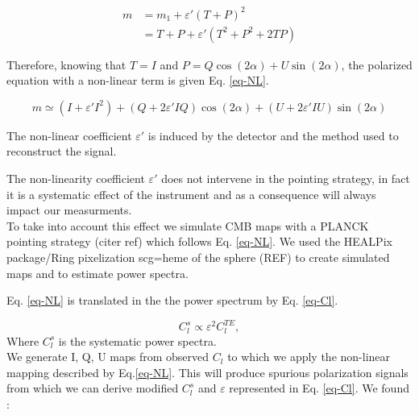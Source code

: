 \begin{equation}
\begin{split}
m & = m_{1} +\varepsilon' (T+P)^{2} \\
 & = T + P + \varepsilon'(T^{2} + P^{2} + 2TP) 
\end{split}
\end{equation}

Therefore, knowing that $T=I$ and $P = Q\cos(2\alpha) + U \sin(2\alpha)$, the polarized equation with a non-linear term is given Eq. \ref{eq-NL}.

\begin{equation}
m  \simeq (I + \varepsilon' I^{2}) + (Q + 2\varepsilon' IQ) \cos(2\alpha) + (U + 2 \varepsilon' IU) \sin(2\alpha)
\label{eq-NL}
\end{equation}

The non-linear coefficient $\varepsilon'$ is induced by the detector and the method used to reconstruct the signal.

The non-linearity coefficient $\varepsilon'$ does not intervene in the pointing strategy, in fact it is a systematic effect of the instrument and as a consequence will always impact our measurments. \\
To take into account this effect we simulate CMB maps with a PLANCK pointing strategy (citer ref) which follows Eq. \ref{eq-NL}. We used the HEALPix package/Ring pixelization scg=heme of the sphere (REF) to create simulated maps and to estimate power spectra.


Eq. \ref{eq-NL} is translated in the the power spectrum by Eq. \ref{eq-Cl}.

\begin{equation}
C_{l}^{s} \propto \varepsilon^{2} C_{l}^{TE},
\label{eq-Cl}
\end{equation}
Where $C_{l}^{s}$ is the systematic power spectra.\\

We generate I, Q, U maps from observed $C_{l}$ to which we apply the non-linear mapping described by Eq.\ref{eq-NL}. This will produce spurious polarization signals from which we can derive modified $C_{l}^{s}$ and $\varepsilon$ represented in Eq. \ref{eq-Cl}. We found :

